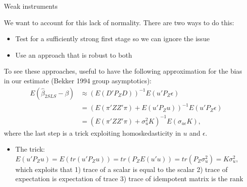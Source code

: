 \documentclass[notes,11pt, aspectratio=169]{beamer}
\newenvironment{wideitemize}{\itemize\addtolength{\itemsep}{10pt}}{\enditemize}
\begin{document}
\begin{frame}{Weak instruments}
  \begin{wideitemize}
  \item We want to account for this lack of normality. There are two ways to do this:
    \begin{itemize}
    \item Test for a sufficiently strong first stage so we can ignore the issue
    \item Use an approach that is robust to both
    \end{itemize}
  \item To see these approaches, useful to have the following
    approximation for the bias in our estimate (Bekker 1994 group asymptotics):
    \begin{align*}
      E(\hat{\beta}_{2SLS} - \beta) &\approx (E(D'P_{Z}D))^{-1}E(u'P_{Z}\epsilon)\\
                                    &= (E(\pi' ZZ'\pi) + E(u'P_{Z}u))^{-1}E(u'P_{Z}\epsilon)\\
                                    &= (E(\pi' ZZ'\pi) + \sigma^{2}_{u}K)^{-1}E(\sigma_{u\epsilon}K),
    \end{align*}
    where the last step is a trick exploiting homoskedasticity in $u$
    and $\epsilon$.
    \begin{itemize}
    \item The trick:
      $E(u'P_{Z}u) = E(tr(u'P_{Z}u)) = tr(P_{Z}E(u'u)) =
      tr(P_{Z}\sigma^{2}_{u}) = K\sigma^{2}_{u}$, which exploits that
      1) trace of a scalar is equal to the scalar 2) trace of
      expectation is expectation of trace 3) trace of idempotent
      matrix is the rank
    \end{itemize}
  \end{wideitemize}
\end{frame}
\end{document}
